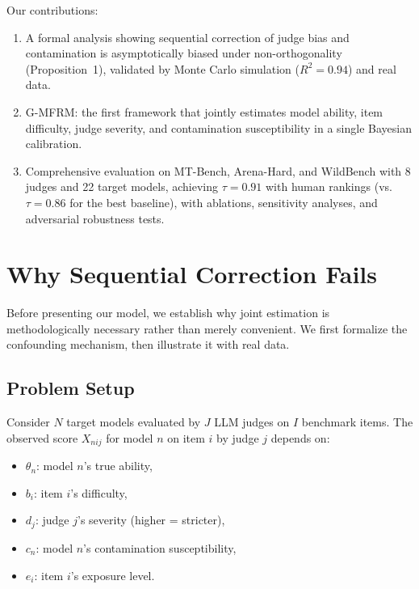 \documentclass[11pt,a4paper]{article}
\begin{document}
Our contributions:
\begin{enumerate}[nosep]
    \item A formal analysis showing sequential correction of judge bias and contamination is asymptotically biased under non-orthogonality (Proposition~1), validated by Monte Carlo simulation ($R^2 = 0.94$) and real data.
    \item G-MFRM: the first framework that jointly estimates model ability, item difficulty, judge severity, and contamination susceptibility in a single Bayesian calibration.
    \item Comprehensive evaluation on MT-Bench, Arena-Hard, and WildBench with 8 judges and 22 target models, achieving $\tau = 0.91$ with human rankings (vs.\ $\tau = 0.86$ for the best baseline), with ablations, sensitivity analyses, and adversarial robustness tests.
\end{enumerate}

\section{Why Sequential Correction Fails}

Before presenting our model, we establish why joint estimation is methodologically necessary rather than merely convenient. We first formalize the confounding mechanism, then illustrate it with real data.

\subsection{Problem Setup}

Consider $N$ target models evaluated by $J$ LLM judges on $I$ benchmark items. The observed score $X_{nij}$ for model $n$ on item $i$ by judge $j$ depends on:
\begin{itemize}[nosep]
    \item $\theta_n$: model $n$'s true ability,
    \item $b_i$: item $i$'s difficulty,
    \item $d_j$: judge $j$'s severity (higher = stricter),
    \item $c_n$: model $n$'s contamination susceptibility,
    \item $e_i$: item $i$'s exposure level.
\end{itemize}
\end{document}
